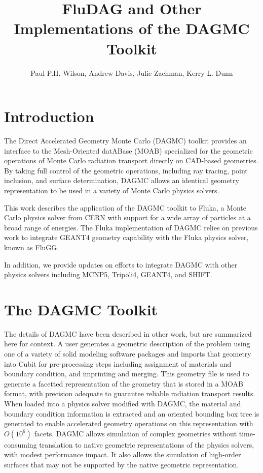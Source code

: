 \documentclass{anstrans}
\title{FluDAG and Other Implementations of the DAGMC Toolkit}
\author{Paul P.H. Wilson, Andrew Davis, Julie Zachman, Kerry L. Dunn}
\institute{University of Wisconsin-Madison, 1500 Engineering Dr,
  Madison, WI 53706}
\begin{document}
\section{Introduction}

The Direct Accelerated Geometry Monte Carlo (DAGMC) toolkit provides
an interface to the Mesh-Oriented datABase (MOAB)\cite{MOAB} specialized for the
geometric operations of Monte Carlo radiation transport directly on
CAD-based geometries.  By taking full control of the geometric
operations, including ray tracing, point inclusion, and surface
determination, DAGMC allows an identical geometry representation to be
used in a variety of Monte Carlo physics solvers.

This work describes the application of the DAGMC toolkit to
Fluka\cite{fluka}, a Monte Carlo physics solver from CERN with support
for a wide array of particles at a broad range of energies.  The Fluka
implementation of DAGMC relies on previous work to integrate
GEANT4\cite{GEANT4} geometry capability with the Fluka physics solver,
known as FluGG\cite{flugg}.

In addition, we provide updates on efforts to integrate DAGMC with
other physics solvers including MCNP5\cite{mcnp5},
Tripoli4\cite{tripoli}, GEANT4, and SHIFT\cite{shift}.

\section{The DAGMC Toolkit}

The details of DAGMC have been described in other work, but are
summarized here for context.  A user generates a geometric description
of the problem using one of a variety of solid modeling software
packages and imports that geometry into Cubit\cite{cubit} for
pre-processing steps including assignment of materials and boundary
condition, and imprinting and merging.  This geometry file is used to
generate a facetted representation of the geometry that is stored in a
MOAB format, with precision adequate to guarantee reliable radiation
transport results\cite{snouffer_ans}.  When loaded into a physics solver
modified with DAGMC, the material and boundary condition information
is extracted and an oriented bounding box tree is generated to enable
accelerated geometry operations on this representation with $O(10^6)$
facets.  DAGMC allows simulation of complex geometries without
time-consuming translation to native geometric representations of the
physics solvers, with modest performance impact.  It also allows the
simulation of high-order surfaces that may not be supported by the
native geometric representation.
\end{document}
